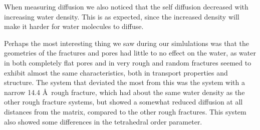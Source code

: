 When measuring diffusion we also noticed that the self diffusion decreased with increasing water density. This is as expected, since the increased density will make it harder for water molecules to diffuse.

Perhaps the most interesting thing we saw during our simlulations was that the geometries of the fractures and pores had little to no effect on the water, as water in both completely flat pores and in very rough and random fractures seemed to exhibit almost the same characteristics, both in transport properties and structure. The system that deviated the most from this was the system with a narrow 14.4 \AA\ rough fracture, which had about the same water density as the other rough fracture systems, but showed a somewhat reduced diffusion at all distances from the matrix, compared to the other rough fractures. This system also showed some differences in the tetrahedral order parameter.


% 






